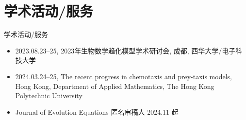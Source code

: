 \section{学术活动/服务}

\begin{frame}{学术活动/服务}
  \begin{itemize}
    \item 2023.08.23--25, 2023年生物数学趋化模型学术研讨会, 成都, 西华大学/电子科技大学
    \item 2024.03.24--25, The recent progress in chemotaxis and prey-taxis models, Hong Kong, Department of Applied Mathematics, The Hong Kong Polytechnic University
    \item Journal of Evolution Equations 匿名审稿人 \hfill 2024.11 起
  \end{itemize}
\end{frame}